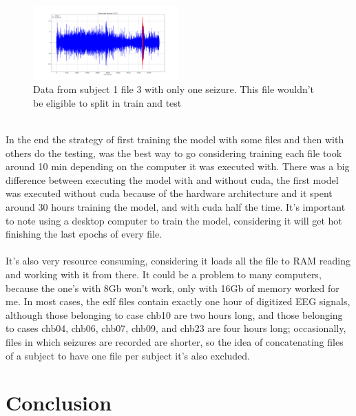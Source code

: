 \begin{figure}[h!]
  \caption{Data from subject 1 file 3 with only one seizure. This file wouldn't be eligible to split in train and test }
  \centering
  \includegraphics[width=0.5\textwidth]{img/1_3-elecFP1-F7.png}
\end{figure}
\leavevmode\\
In the end the strategy of first training the model with some files and then with others do the testing, was the best way to go considering training each file took around 10 min depending on the computer it was executed with. There was a big difference between executing the model with and without cuda, the first model was executed without cuda because of the hardware architecture and it spent around 30 hours training the model, and with cuda half the time. It’s important to note using a desktop computer to train the model, considering it will get hot finishing the last epochs of every file.
\\\\
It’s also very resource consuming, considering it loads all the file to RAM reading and working with it from there. It could be a problem to many computers, because the one’s with 8Gb won’t work, only with 16Gb of memory worked for me. In most cases, the edf files contain exactly one hour of digitized EEG signals, although those belonging to case chb10 are two hours long, and those belonging to cases chb04, chb06, chb07, chb09, and chb23 are four hours long; occasionally, files in which seizures are recorded are shorter, so the idea of concatenating files of a subject to have one file per subject it’s also excluded. 
\leavevmode\\


\section{Conclusion}

